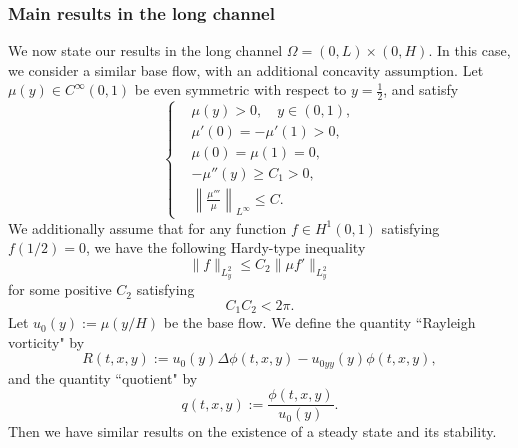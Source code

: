 \documentclass[reqno, 11pt]{amsart}
\theoremstyle{plain}
\theoremstyle{definition}
\theoremstyle{remark}
\numberwithin{equation}{section}
\begin{document}
\subsubsection{Main results in the long channel}

We now state our results in the long channel $\Omega = (0,L) \times (0,H)$. In this case, we consider a similar base flow, with an additional concavity assumption. Let $\mu(y) \in C^\infty(0,1)$ be even symmetric with respect to $y = \frac{1}{2}$, and satisfy
\begin{equation} \label{assumption_1}
\left\{
\begin{aligned}
&\mu(y) > 0, \quad y \in (0, 1),\\
&\mu'(0) = - \mu'(1) > 0,\\
&\mu(0) = \mu(1) = 0,\\
&-\mu''(y) \ge C_1 > 0,\\
&\left\|\frac{\mu'''}{\mu}\right\|_{L^\infty} \le C.
\end{aligned}\right.
\end{equation}
We additionally assume that for any function $f \in H^1(0,1)$ satisfying $f(1/2) = 0$, we have the following Hardy-type inequality
\begin{equation}\label{assumption_2}
\|f\|_{L^2_y} \le C_2 \| \mu f' \|_{L^2_y}
\end{equation}
for some positive $C_2$ satisfying
\begin{equation}\label{assumption_3}
C_1 C_2 < 2\pi.
\end{equation}
Let $u_0(y):= \mu(y/H)$ be the base flow.
We define the quantity ``Rayleigh vorticity" by
\begin{equation}\label{def:R}
R(t,x,y):= u_0(y) \Delta \phi(t,x,y) - u_{0yy}(y) \phi(t,x,y),
\end{equation}
and the quantity ``quotient" by
\begin{equation}\label{quotient}
q(t,x,y):= \frac{\phi(t,x,y)}{u_0(y)}.
\end{equation}
Then we have similar results on the existence of a steady state and its stability.
\end{document}

